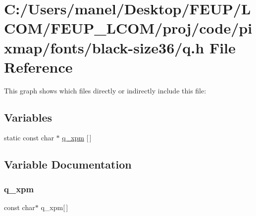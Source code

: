 \hypertarget{black-size36_2q_8h}{}\section{C\+:/\+Users/manel/\+Desktop/\+F\+E\+U\+P/\+L\+C\+O\+M/\+F\+E\+U\+P\+\_\+\+L\+C\+O\+M/proj/code/pixmap/fonts/black-\/size36/q.h File Reference}
\label{black-size36_2q_8h}
This graph shows which files directly or indirectly include this file\+:
\subsection*{Variables}
\begin{DoxyCompactItemize}
\item 
static const char $\ast$ \mbox{\hyperlink{black-size36_2q_8h_a7b42597d066f3f091a0e44300f52f3c1}{q\+\_\+xpm}} \mbox{[}$\,$\mbox{]}
\end{DoxyCompactItemize}


\subsection{Variable Documentation}
\mbox{\label{black-size36_2q_8h_a7b42597d066f3f091a0e44300f52f3c1}} 
\subsubsection{\texorpdfstring{q\_xpm}{q\_xpm}}
{\footnotesize\ttfamily const char$\ast$ q\+\_\+xpm\mbox{[}$\,$\mbox{]}\hspace{0.3cm}{\ttfamily [static]}}

